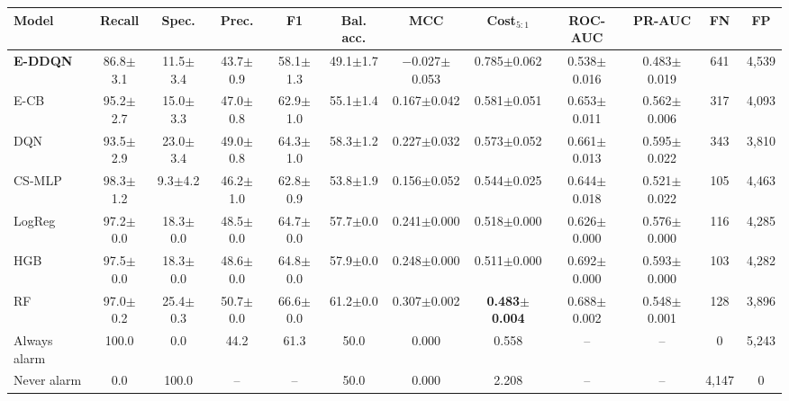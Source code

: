 \begin{tabular}{lccccccccccc}
\toprule
Model & Recall & Spec. & Prec. & F1 & Bal. acc. & MCC & Cost$_{5:1}$ & ROC-AUC & PR-AUC & FN & FP \\
\midrule
\textbf{E-DDQN} & 86.8$\pm$3.1 & 11.5$\pm$3.4 & 43.7$\pm$0.9 & 58.1$\pm$1.3 & 49.1$\pm$1.7 & $-$0.027$\pm$0.053 & 0.785$\pm$0.062 & 0.538$\pm$0.016 & 0.483$\pm$0.019 & 641 & 4,539 \\
E-CB & 95.2$\pm$2.7 & 15.0$\pm$3.3 & 47.0$\pm$0.8 & 62.9$\pm$1.0 & 55.1$\pm$1.4 & 0.167$\pm$0.042 & 0.581$\pm$0.051 & 0.653$\pm$0.011 & 0.562$\pm$0.006 & 317 & 4,093 \\
DQN & 93.5$\pm$2.9 & 23.0$\pm$3.4 & 49.0$\pm$0.8 & 64.3$\pm$1.0 & 58.3$\pm$1.2 & 0.227$\pm$0.032 & 0.573$\pm$0.052 & 0.661$\pm$0.013 & 0.595$\pm$0.022 & 343 & 3,810 \\
CS-MLP & 98.3$\pm$1.2 & 9.3$\pm$4.2 & 46.2$\pm$1.0 & 62.8$\pm$0.9 & 53.8$\pm$1.9 & 0.156$\pm$0.052 & 0.544$\pm$0.025 & 0.644$\pm$0.018 & 0.521$\pm$0.022 & 105 & 4,463 \\
LogReg & 97.2$\pm$0.0 & 18.3$\pm$0.0 & 48.5$\pm$0.0 & 64.7$\pm$0.0 & 57.7$\pm$0.0 & 0.241$\pm$0.000 & 0.518$\pm$0.000 & 0.626$\pm$0.000 & 0.576$\pm$0.000 & 116 & 4,285 \\
HGB & 97.5$\pm$0.0 & 18.3$\pm$0.0 & 48.6$\pm$0.0 & 64.8$\pm$0.0 & 57.9$\pm$0.0 & 0.248$\pm$0.000 & 0.511$\pm$0.000 & 0.692$\pm$0.000 & 0.593$\pm$0.000 & 103 & 4,282 \\
RF & 97.0$\pm$0.2 & 25.4$\pm$0.3 & 50.7$\pm$0.0 & 66.6$\pm$0.0 & 61.2$\pm$0.0 & 0.307$\pm$0.002 & \textbf{0.483$\pm$0.004} & 0.688$\pm$0.002 & 0.548$\pm$0.001 & 128 & 3,896 \\
\midrule
Always alarm & 100.0 & 0.0 & 44.2 & 61.3 & 50.0 & 0.000 & 0.558 & -- & -- & 0 & 5,243 \\
Never alarm & 0.0 & 100.0 & -- & -- & 50.0 & 0.000 & 2.208 & -- & -- & 4,147 & 0 \\
\bottomrule
\end{tabular}
